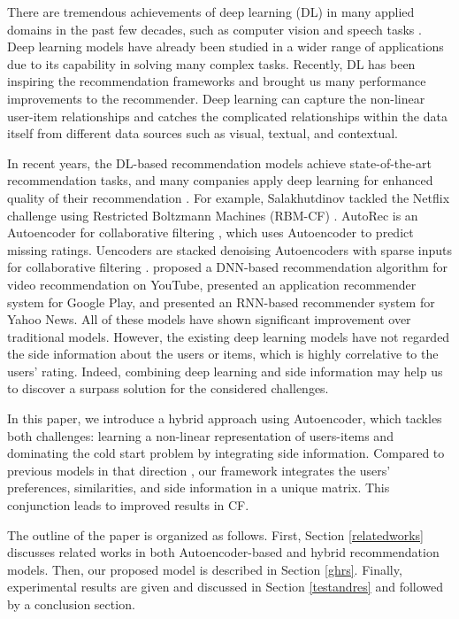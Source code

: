 \documentclass[a4paper,fleqn]{cas-dc}
\begin{document}
There are tremendous achievements of deep learning (DL) in many applied domains in the past few decades, such as computer vision \citep{16ding2015a, 17tian2016a, 18byeon2016a, 19huang2016a} and speech tasks \citep{20graves2013a, 21xue2016a}. Deep learning models have already been studied in a wider range of applications due to its capability in solving many complex tasks. Recently, DL has been inspiring the recommendation frameworks and brought us many performance improvements to the recommender. Deep learning can capture the non-linear user-item relationships and catches the complicated relationships within the data itself from different data sources such as visual, textual, and contextual.

In recent years, the DL-based recommendation models achieve state-of-the-art recommendation tasks, and many companies apply deep learning for enhanced quality of their recommendation \citep{22covington2016a, 23sh2017a}. For example, Salakhutdinov tackled the Netflix challenge using Restricted Boltzmann Machines (RBM-CF) \citep{83salakhutdinov2007restricted, 24georgiev2013a}. AutoRec is an Autoencoder for collaborative filtering \citep{25sedhain2015a}, which uses Autoencoder to predict missing ratings. Uencoders are stacked denoising Autoencoders with sparse inputs for collaborative filtering \citep{26strub2015a}. \citet{22covington2016a} proposed a DNN-based recommendation algorithm for video recommendation on YouTube, \citet{27cheng2016a} presented an application recommender system for Google Play, and \citet{23sh2017a} presented an RNN-based recommender system for Yahoo News. All of these models have shown significant improvement over traditional models. However, the existing deep learning models have not regarded the side information about the users or items, which is highly correlative to the users' rating. Indeed, combining deep learning and side information may help us to discover a surpass solution for the considered challenges.

In this paper, we introduce a hybrid approach using Autoencoder, which tackles both challenges: learning a non-linear representation of users-items and dominating the cold start problem by integrating side information. Compared to previous models in that direction \citep{25sedhain2015a, 26strub2015a, 28wu2016a}, our framework integrates the users' preferences, similarities, and side information in a unique matrix. This conjunction leads to improved results in CF.

The outline of the paper is organized as follows. First, Section \ref{relatedworks} discusses related works in both Autoencoder-based and hybrid recommendation models. Then, our proposed model is described in Section \ref{ghrs}. Finally, experimental results are given and discussed in Section \ref{testandres} and followed by a conclusion section.
\end{document}
